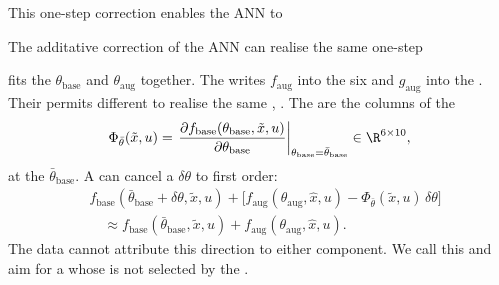 This one-step correction enables the ANN to 

The additative correction of the ANN can realise 
the same one-step 

 fits the  $\theta_{\mathrm{base}}$ and  $\theta_{\mathrm{aug}}$ together. The  writes
$f_{\mathrm{aug}}$ into the six  and $g_{\mathrm{aug}}$ into the
. Their  permits different 
to realise the same  \cite[Ex.~2]{gyorok2026obc},
\cite[Ex.~1]{gyorok2025l4dc}. The  are the columns
of the  \cite[Eq.~(15)]{gyorok2025l4dc}
\begin{equation}
 \Phi_{\bar\theta}(\tilde x,u)
 =\left.\frac{\partial f_{\mathrm{base}}(\theta_{\mathrm{base}},\tilde x,u)}
   {\partial\theta_{\mathrm{base}}}\right|_{\theta_{\mathrm{base}}=\bar\theta_{\mathrm{base}}}
   \in\R^{6\times10},
\label{eq:obc_sens}
\end{equation}
at the  $\bar\theta_{\mathrm{base}}$. A  can cancel
a  $\delta\theta$ to first order:
\begin{equation}
\begin{aligned}
 &f_{\mathrm{base}}(\bar\theta_{\mathrm{base}}+\delta\theta,\tilde x,u)
 +\bigl[f_{\mathrm{aug}}(\theta_{\mathrm{aug}},\hat x,u)
 -\Phi_{\bar\theta}(\tilde x,u)\,\delta\theta\bigr]\\
 &\quad\approx f_{\mathrm{base}}(\bar\theta_{\mathrm{base}},\tilde x,u)
 +f_{\mathrm{aug}}(\theta_{\mathrm{aug}},\hat x,u).
\end{aligned}
\label{eq:obc_negation}
\end{equation}
The data cannot attribute this direction to either component. We call this
 and aim for a  whose  is not selected by the
.

